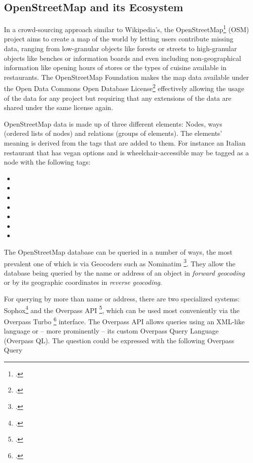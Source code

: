\subsection{OpenStreetMap and its Ecosystem}
\label{sec:osm}

In a crowd-sourcing approach similar to Wikipedia’s, the
OpenStreetMap\footcite{openstreetmap} (OSM) project aims to create a map of the
world by letting users contribute missing data, ranging from low-granular
objects like forests or streets to high-granular objects like benches or
information boards and even including non-geographical information like opening
hours of stores or the types of cuisine available in restaurants. The
OpenStreetMap Foundation makes the map data available under the Open Data
Commons Open Database License\footcite{odbl} effectively allowing the usage of
the data for any project but requiring that any extensions of the data are
shared under the same license again.

OpenStreetMap data is made up of three different elements: Nodes, ways (ordered
lists of nodes) and relations (groups of elements). The elements’ meaning is
derived from the tags that are added to them. For instance an Italian restaurant
that has vegan options and is wheelchair-accessible may be tagged as a node with
the following tags:

\begin{itemize}
\item {}
\item {}
\item {}
\item {}
\item {}
\item {}
\item {}
\end{itemize}

The OpenStreetMap database can be queried in a number of ways, the most
prevalent one of which is via Geocoders such as Nominatim \footcite{nominatim}.
They allow the database being queried by the name or address of an object in
\emph{forward geocoding} or by its geographic coordinates in \emph{reverse
  geocoding}.

For querying by more than name or address, there are two specialized systems:
Sophox\footcite[The official website at \url{https://sophox.org} is offline as
of December 2020]{sophox} and the Overpass API \footcite{overpass-api}, which
can be used most conveniently via the Overpass Turbo \footcite{overpass-turbo}
interface. The Overpass API allows queries using an XML-like language or – more
prominently – its custom Overpass Query Language (Overpass QL). The question
 could be
expressed with the following Overpass Query

